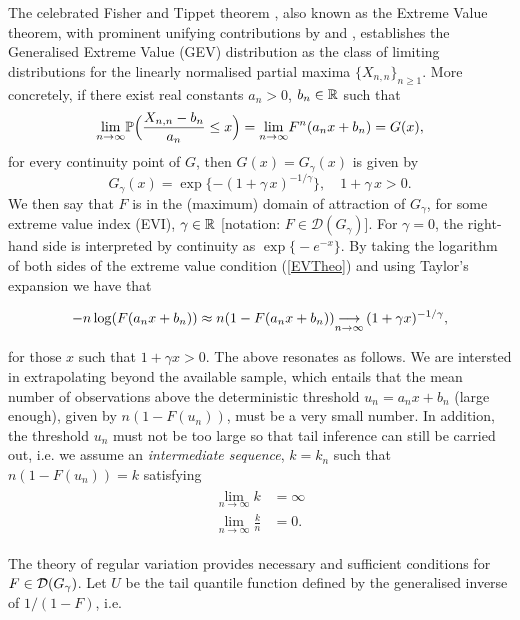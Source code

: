 The celebrated Fisher and Tippet theorem \citep{ft28}, also known as the Extreme Value theorem, with prominent unifying contributions by \cite{Gnedenko:43} and \cite{deHaan:70}, establishes the Generalised Extreme Value (GEV) distribution as the class of limiting distributions for the linearly normalised partial maxima $\{X_{n,n} \}_{n\geq 1}$. More concretely, if there exist real constants $a_n>0$, $b_n \in {\mathbb{R}}$ such that
\begin{equation}\label{EVTheo}
	\displaystyle {\lim_{n \rightarrow{\infty}}} \mathbb{P} \Bigl( \frac{X_{n,n}-b_n}{a_n} \leq x\Bigr)= \displaystyle {\lim_{n \rightarrow{\infty}}} F^n (a_n x + b_n) = G(x),
\end{equation}
for every continuity point of $G$, then $G(x)= G_{\gamma}(x)$ is given by
\begin{equation}\label{GEVd}
	G_{\gamma}(x)= \exp \{ -(1+ \gamma\, x)^{-1/\gamma}\}, \quad 1+\gamma\,x >0.
\end{equation}
We then say that $F$ is in the (maximum) domain of attraction of $G_\gamma$,  for some extreme value index (EVI), $\gamma \in {\mathbb{R}}$ [notation: $F \in \mathcal{D}(G_{\gamma}) $]. For $\gamma=0$, the right-hand side is interpreted by continuity as $\exp\bigl\{-e^{-x}\bigr\}$. By taking the logarithm of both sides of the extreme value condition (\ref{EVTheo}) and using Taylor's expansion we have that 


\begin{equation}
-n\log(F(a_n x + b_n )) \approx n(1 - F(a_n x + b_n )) \displaystyle {\mathop {\longrightarrow}_{n \rightarrow \infty}\,} (1 + \gamma x )^{-1/\gamma},
\end{equation}

\noindent for those $x$ such that $ 1 + \gamma x > 0 $. The above resonates as follows. We are intersted in extrapolating beyond the available sample, which entails that the mean number of observations above the deterministic threshold $ u_n = a_n x + b_n$ (large enough), given by $ n( 1- F(u_n)) $, must be a very small number. In addition, the threshold $ u_n $ must not be too large so that tail inference can still be carried out, i.e. we assume an \textit{intermediate sequence}, $ k = k_n $ such that $n (1 - F(u_n)) = k$ satisfying
\begin{align} \label{eq:k_cond}
\begin{split}
\lim_{n \rightarrow \infty} k &= \infty \\
\lim_{n \rightarrow \infty} \frac{k}{n} &= 0.
\end{split}
\end{align}

The theory of regular variation \citep{Binghametal:87,deHaan:70, deHF:06} provides necessary and sufficient conditions for $F\in {\ensuremath{\mathcal{D}}}(G_{\gamma})$. Let $U$ be the tail quantile function defined by the generalised inverse of $1/(1-F)$, i.e.


